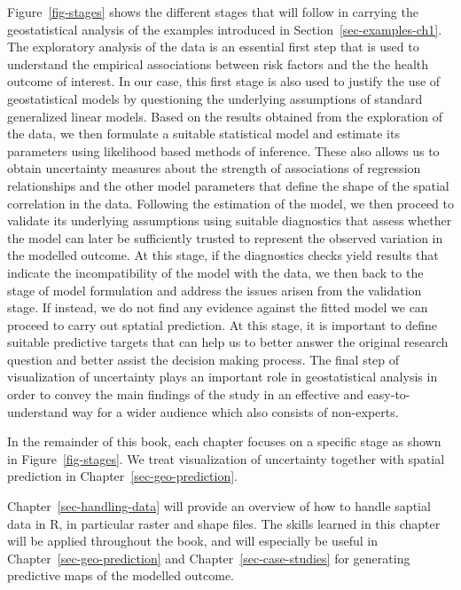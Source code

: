 \documentclass[
  letterpaper,
]{krantz}
\begin{document}
Figure~\ref{fig-stages} shows the different stages that will follow in
carrying the geostatistical analysis of the examples introduced in
Section~\ref{sec-examples-ch1}. The exploratory analysis of the data is
an essential first step that is used to understand the empirical
associations between risk factors and the the health outcome of
interest. In our case, this first stage is also used to justify the use
of geostatistical models by questioning the underlying assumptions of
standard generalized linear models. Based on the results obtained from
the exploration of the data, we then formulate a suitable statistical
model and estimate its parameters using likelihood based methods of
inference. These also allows us to obtain uncertainty measures about the
strength of associations of regression relationships and the other model
parameters that define the shape of the spatial correlation in the data.
Following the estimation of the model, we then proceed to validate its
underlying assumptions using suitable diagnostics that assess whether
the model can later be sufficiently trusted to represent the observed
variation in the modelled outcome. At this stage, if the diagnostics
checks yield results that indicate the incompatibility of the model with
the data, we then back to the stage of model formulation and address the
issues arisen from the validation stage. If instead, we do not find any
evidence against the fitted model we can proceed to carry out sptatial
prediction. At this stage, it is important to define suitable predictive
targets that can help us to better answer the original research question
and better assist the decision making process. The final step of
visualization of uncertainty plays an important role in geostatistical
analysis in order to convey the main findings of the study in an
effective and easy-to-understand way for a wider audience which also
consists of non-experts.

In the remainder of this book, each chapter focuses on a specific stage
as shown in Figure~\ref{fig-stages}. We treat visualization of
uncertainty together with spatial prediction in
Chapter~\ref{sec-geo-prediction}.

Chapter~\ref{sec-handling-data} will provide an overview of how to
handle saptial data in R, in particular raster and shape files. The
skills learned in this chapter will be applied throughout the book, and
will especially be useful in Chapter~\ref{sec-geo-prediction} and
Chapter~\ref{sec-case-studies} for generating predictive maps of the
modelled outcome.
\end{document}
